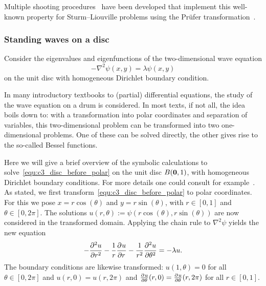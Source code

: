 Multiple shooting procedures~\cite{baeyens_fast_2020,ledoux_matslise_2016,ixaru_cp_2000} have been developed that implement this well-known property for Sturm--Liouville problems using the Prüfer transformation~\cite{pruefer_neue_1926}.

\subsubsection{Standing waves on a disc}\label{sec:c3_standing_waves_on_disc}

Consider the eigenvalues and eigenfunctions of the two-dimensional wave equation
\begin{equation}\label{equ:c3_disc_before_polar}
  -\nabla^2 \psi(x, y) = \lambda \psi(x, y)
\end{equation}
on the unit disc with homogeneous Dirichlet boundary condition.

In many introductory textbooks to (partial) differential equations, the study of the wave equation on a drum is considered. In most texts, if not all, the idea boils down to: with a transformation into polar coordinates and separation of variables, this two-dimensional problem can be transformed into two one-dimensional problems. One of these can be solved directly, the other gives rise to the so-called Bessel functions.

Here we will give a brief overview of the symbolic calculations to solve~\eqref{equ:c3_disc_before_polar} on the unit disc $B(\vb{0}, 1)$, with homogeneous Dirichlet boundary conditions. For more details one could consult for example~\cite[chapter~4]{asmar_partial_2005}. As stated, we first transform~\eqref{equ:c3_disc_before_polar} to polar coordinates. For this we pose $x = r\cos(\theta)$ and $y = r\sin(\theta)$, with $r \in [0,1]$ and $\theta \in [0, 2\pi]$. The solutions $u(r, \theta) := \psi(r\cos(\theta), r\sin(\theta))$ are now considered in the transformed domain. Applying the chain rule to $\nabla^2\psi$ yields the new equation
\begin{equation}\label{equ:c3_disc_after_polar}
  -{\pdv[2]{u}{r}} - \frac{1}{r}{\pdv[]{u}{r}} - \frac{1}{r^2} {\pdv[2]{u}{\theta}} = - \lambda u\text{.}
\end{equation}
The boundary conditions are likewise transformed: $u(1, \theta) = 0$ for all $\theta \in [0, 2\pi]$ and $u(r, 0) = u(r, 2\pi)$ and ${\pdv[]{u}{\theta}}(r, 0) = {\pdv[]{u}{\theta}}(r, 2\pi)$ for all $r \in [0, 1]$.

